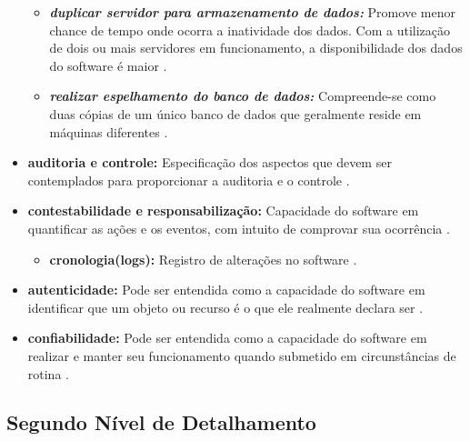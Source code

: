 \begin{itemize}
\begin{itemize}
	 		\item \textbf{\textit{duplicar servidor para armazenamento de dados:}} Promove menor chance de tempo onde ocorra a inatividade dos dados. Com a utilização de dois ou mais servidores em funcionamento, a disponibilidade dos dados do software é maior \cite{date2004introduccao}\cite{affleck2012supporting}.   
	 		
	 		\item \textbf{\textit{realizar espelhamento do banco de dados:}} Compreende-se como duas cópias de um único banco de dados que geralmente reside em máquinas diferentes \cite{date2004introduccao}\cite{affleck2012supporting}. 
	 		
	 \end{itemize}
 
 	\item \textbf{auditoria e controle:} Especificação dos aspectos que devem ser contemplados para proporcionar a auditoria e o controle \cite{benitti2015taxonomia}. 
 	
 	\item  \textbf{contestabilidade e responsabilização:} Capacidade do software em quantificar as ações e os eventos, com intuito de comprovar sua ocorrência \cite{benitti2015taxonomia}. 
 	
 	\begin{itemize}
 		
 		\item \textbf{cronologia(logs):} Registro de alterações no software \cite{benitti2015taxonomia}.
 		
 	\end{itemize}
 	
 	\item \textbf{autenticidade:} Pode ser entendida como a capacidade do software em identificar que um objeto ou recurso é o que ele realmente declara ser \cite{benitti2015taxonomia}. 
 	
 	\item \textbf{confiabilidade:} Pode ser entendida como a capacidade do software em realizar e manter seu funcionamento quando submetido em circunstâncias de rotina \cite{benitti2015taxonomia}. 
 	
\end{itemize}

\subsection{Segundo Nível de Detalhamento}
\label{sub:segundoNivel}

